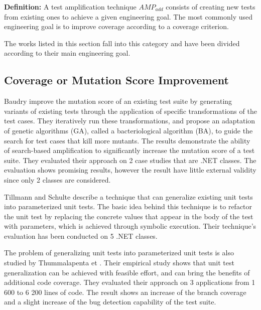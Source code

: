 \medskip
\begin{mdframed}
\textbf{Definition:} A test amplification technique $AMP_{add}$ consists of creating new tests from existing ones to achieve a given engineering goal.
	The most commonly used engineering goal is to improve coverage according to a coverage criterion.
\end{mdframed}

The works listed in this section fall into this category and have been divided according to their main engineering goal.

\subsection{Coverage or Mutation Score Improvement}
\label{subsec:sota:category-1:coverage-vs-mutation}

Baudry \etal \cite{Baudry05a} \cite{Baudry05d} improve the mutation score of an existing test suite by generating variants of existing tests through the application of specific transformations of the test cases. 
They iteratively run these transformations, and propose an adaptation of genetic algorithms (GA), called a bacteriological algorithm (BA), to guide the search for test cases that kill more mutants.  
The results demonstrate the ability of search-based amplification to significantly increase the mutation score of a test suite.
They evaluated their approach on 2 case studies that are .NET classes.
The evaluation shows promising results, however the result have little external validity since only 2 classes are considered.

Tillmann and Schulte \cite{tillmann2006unit} describe a technique that can generalize existing unit tests into parameterized unit tests. 
The basic idea behind this technique is to refactor the unit test by replacing the concrete values that appear in the body of the test with parameters, which is achieved through symbolic execution. 
Their technique's evaluation has been conducted on 5 .NET classes.

The problem of generalizing unit tests into parameterized unit tests is also studied by Thummalapenta et \etal\cite{marri2010retrofitting}. 
Their empirical study shows that unit test generalization can be achieved with feasible effort, and can bring the benefits of additional code coverage.
They evaluated their approach on 3 applications from 1 600 to 6 200 lines of code. 
The result shows an increase of the branch coverage and a slight increase of the bug detection capability of the test suite.

